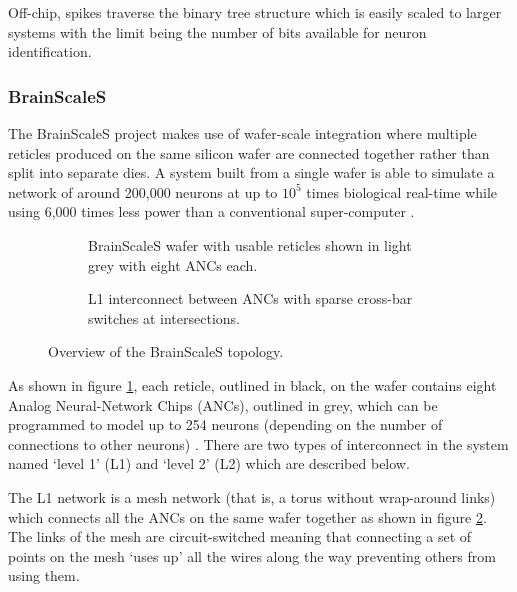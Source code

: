 				Off-chip, spikes traverse the binary tree structure which is easily
				scaled to larger systems with the limit being the number of bits
				available for neuron identification.
			
			\subsubsection{BrainScaleS}
				
				The BrainScaleS project makes use of wafer-scale integration where
				multiple reticles produced on the same silicon wafer are connected together
				rather than split into separate dies. A system built from a single wafer
				is able to simulate a network of around 200,000 neurons at up to $10^5$
				times biological real-time while using 6,000 times less power than a
				conventional super-computer \cite{schemmel08}.
				
				\begin{figure}
					\center
					\begin{subfigure}[b]{0.45\textwidth}
						\center
						
						\caption{BrainScaleS wafer with usable reticles shown in light
						grey with eight ANCs each.}
						\label{fig:brainscales-wafer}
					\end{subfigure}
					\hspace{1ex}
					\begin{subfigure}[b]{0.45\textwidth}
						\center
						
						\caption{L1 interconnect between ANCs with sparse cross-bar
						switches at intersections.}
						\label{fig:brainscales-l1}
					\end{subfigure}
					
					\caption{Overview of the BrainScaleS topology.}
					\label{fig:brainscales-topology}
				\end{figure}
				
				As shown in figure \ref{fig:brainscales-wafer}, each reticle, outlined
				in black, on the wafer contains eight Analog Neural-Network Chips
				(ANCs), outlined in grey, which can be programmed to model up to 254
				neurons (depending on the number of connections to other neurons)
				\cite{schemmel10}. There are two types of interconnect in the system
				named `level 1' (L1) and `level 2' (L2) which are described below.
			
				The L1 network is a mesh network (that is, a torus without wrap-around
				links) which connects all the ANCs on the same wafer together as shown
				in figure \ref{fig:brainscales-l1}. The links of the mesh are
				circuit-switched meaning that connecting a set of points on the mesh
				`uses up' all the wires along the way preventing others from using them.
				
